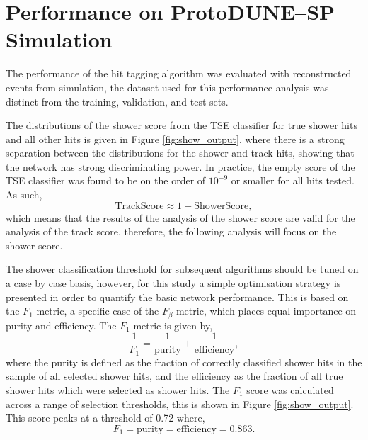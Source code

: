 \section{Performance on ProtoDUNE--SP Simulation} \label{cnn-perf-sim}

The performance of the hit tagging algorithm was evaluated with reconstructed
events from \protodune{} simulation, the dataset used for this performance
analysis was distinct from the training, validation, and test sets. 

The distributions of the shower score from the TSE classifier for true shower 
hits and all other hits is given in Figure \ref{fig:show_output}, where there is a 
strong separation between the distributions for the shower and track hits, 
showing that the network has strong discriminating power. In practice, the 
empty score of the TSE classifier was found to be on the order of $10^{-9}$ or 
smaller for all hits tested. As such,
\begin{equation*}
	\mbox{TrackScore} \approx 1 - \mbox{ShowerScore},
\end{equation*}
which means that the results of the analysis of the shower score are valid for
the analysis of the track score, therefore, the following analysis will focus on
the shower score.

The shower classification threshold for subsequent algorithms should be tuned on
a case by case basis, however, for this study a simple optimisation strategy 
is presented in order to quantify the basic network performance. This is based
on the $F_1$ metric, a specific case of the $F_\beta$ 
metric\cite{VanRijsbergenC.J.1975Ir}, which places equal importance on 
purity and efficiency. The $F_1$ metric is given by, 
\begin{equation*}
	\frac{1}{F_1} = \frac{1}{\mbox{purity}} + \frac{1}{\mbox{efficiency}},
\end{equation*}
where the purity is defined as the fraction of correctly classified shower 
hits in the sample of all selected shower hits, and the efficiency as the 
fraction of all true shower hits which were selected as shower hits. The $F_1$ 
score was calculated across a range of selection thresholds, this is shown in 
Figure \ref{fig:show_output}. This score peaks at a threshold of 0.72 where, 
\begin{equation*} 
	F_1 = \mbox{purity} = \mbox{efficiency} = 0.863.  
\end{equation*}

